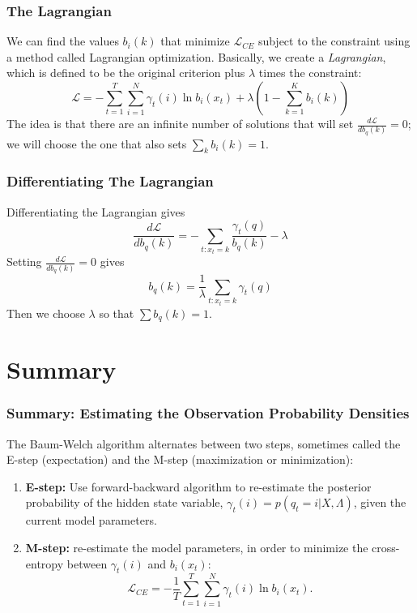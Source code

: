 \documentclass{beamer}
\begin{document}
\begin{frame}
  \frametitle{The Lagrangian}

  We can find the values $b_i(k)$ that minimize ${\mathcal L}_{CE}$
  subject to the constraint using a method called Lagrangian
  optimization.  Basically, we create a {\em Lagrangian}, which is
  defined to be the original criterion plus $\lambda$ times the
  constraint:
  \begin{displaymath}
    {\mathcal L} = -\sum_{t=1}^T\sum_{i=1}^N\gamma_t(i)\ln b_i(x_t)+
    \lambda\left(1-\sum_{k=1}^K b_i(k)\right)
  \end{displaymath}
  The idea is that there are an infinite number of solutions that will
  set $\frac{d{\mathcal L}}{db_q(k)}=0$; we will choose the one that also sets $\sum_k
  b_i(k)=1$.
\end{frame}
  
\begin{frame}
  \frametitle{Differentiating The Lagrangian}

  Differentiating the Lagrangian gives
  \begin{displaymath}
    \frac{d{\mathcal L}}{db_q(k)} = -\sum_{t:x_t=k}\frac{\gamma_t(q)}{b_q(k)}-\lambda
  \end{displaymath}
  Setting $\frac{d{\mathcal L}}{db_q(k)}=0$ gives
  \begin{displaymath}
    b_q(k)=\frac{1}{\lambda}\sum_{t:x_t=k}\gamma_t(q)
  \end{displaymath}
  Then we choose $\lambda$ so that $\sum b_q(k)=1$.
\end{frame}

\section[Summary]{Summary}
\setcounter{subsection}{1}

\begin{frame}
  \frametitle{Summary: Estimating the Observation Probability Densities}

  The Baum-Welch algorithm alternates between two steps, sometimes
  called the E-step (expectation) and the M-step (maximization or
  minimization):
  \begin{enumerate}
  \item {\bf E-step:} Use forward-backward algorithm to re-estimate
    the posterior probability of the hidden state variable,
    $\gamma_t(i)=p(q_t=i|X,\Lambda)$, given the current model
    parameters.
  \item {\bf M-step:} re-estimate the model parameters, in order to
    minimize the cross-entropy between $\gamma_t(i)$ and $b_i(x_t)$:
    \begin{displaymath}
      {\mathcal L}_{CE} = -\frac{1}{T}\sum_{t=1}^T\sum_{i=1}^N\gamma_t(i)\ln b_i(x_t).
    \end{displaymath}
  \end{enumerate}
\end{frame}
\end{document}
